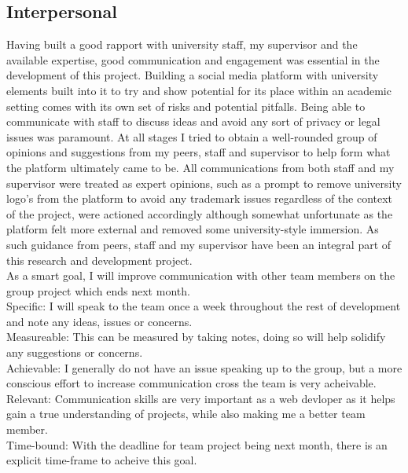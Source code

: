 \documentclass[lettersize,journal]{IEEEtran}
\begin{document}
\subsection{Interpersonal}
Having built a good rapport with university staff, my supervisor and the available expertise, good communication and engagement was essential in the development of this project. Building a social media 
platform with university elements built into it to try and show potential for its place within an academic setting comes with its own set of risks and potential pitfalls. Being able to communicate with 
staff to discuss ideas and avoid any sort of privacy or legal issues was paramount. At all stages I tried to obtain a well-rounded group of opinions and suggestions from my peers, staff and supervisor 
to help form what the platform ultimately came to be. All communications from both staff and my supervisor were treated as expert opinions, such as a prompt to remove university logo's from the platform
to avoid any trademark issues regardless of the context of the project, were actioned accordingly although somewhat unfortunate as the platform felt more external and removed some university-style
immersion. As such guidance from peers, staff and my supervisor have been an integral part of this research and development project. 
\\As a smart goal, I will improve communication with other team members on the group project which ends next month.
\\Specific: I will speak to the team once a week throughout the rest of development and note any ideas, issues or concerns.
\\Measureable: This can be measured by taking notes, doing so will help solidify any suggestions or concerns.
\\Achievable: I generally do not have an issue speaking up to the group, but a more conscious effort to increase communication cross the team is very acheivable.
\\Relevant: Communication skills are very important as a web devloper as it helps gain a true understanding of projects, while also making me a better team member.
\\Time-bound: With the deadline for team project being next month, there is an explicit time-frame to acheive this goal.
\end{document}
